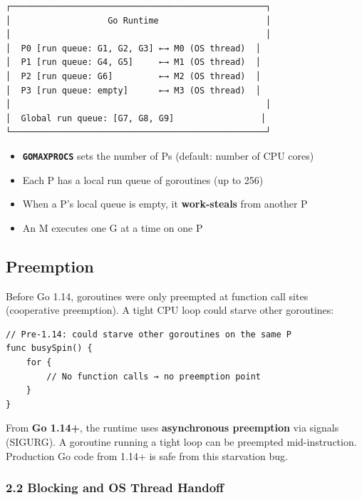 \documentclass[11pt,a4paper,oneside]{book}
\providecommand{\tightlist}{\setlength{\itemsep}{0pt}\setlength{\parskip}{0pt}}
\begin{document}
\begin{verbatim}
┌──────────────────────────────────────────────────┐
│                   Go Runtime                     │
│                                                  │
│  P0 [run queue: G1, G2, G3] ←→ M0 (OS thread)  │
│  P1 [run queue: G4, G5]     ←→ M1 (OS thread)  │
│  P2 [run queue: G6]         ←→ M2 (OS thread)  │
│  P3 [run queue: empty]      ←→ M3 (OS thread)  │
│                                                  │
│  Global run queue: [G7, G8, G9]                 │
└──────────────────────────────────────────────────┘
\end{verbatim}

\begin{itemize}
\tightlist
\item
  \textbf{\texttt{GOMAXPROCS}} sets the number of Ps (default: number of
  CPU cores)
\item
  Each P has a local run queue of goroutines (up to 256)
\item
  When a P's local queue is empty, it \textbf{work-steals} from another
  P
\item
  An M executes one G at a time on one P
\end{itemize}

\subsection{Preemption}

Before Go 1.14, goroutines were only preempted at function call sites
(cooperative preemption). A tight CPU loop could starve other
goroutines:

\begin{verbatim}
// Pre-1.14: could starve other goroutines on the same P
func busySpin() {
    for {
        // No function calls → no preemption point
    }
}
\end{verbatim}

From \textbf{Go 1.14+}, the runtime uses \textbf{asynchronous
preemption} via signals (SIGURG). A goroutine running a tight loop can
be preempted mid-instruction. Production Go code from 1.14+ is safe from
this starvation bug.

\subsubsection{2.2 Blocking and OS Thread
Handoff}
\end{document}
